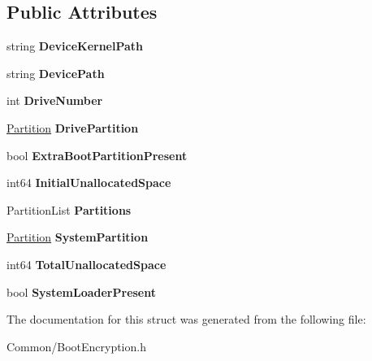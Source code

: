 \subsection*{Public Attributes}
\begin{DoxyCompactItemize}
\item 
\mbox{\label{struct_gost_crypt_1_1_system_drive_configuration_a2a97c9f7ce646028174f566e802a169f}} 
string {\bfseries Device\+Kernel\+Path}
\item 
\mbox{\label{struct_gost_crypt_1_1_system_drive_configuration_ac235ccb78431f067b64b8c2bf45d0c8a}} 
string {\bfseries Device\+Path}
\item 
\mbox{\label{struct_gost_crypt_1_1_system_drive_configuration_a5974148430f34abe503b290e932fd532}} 
int {\bfseries Drive\+Number}
\item 
\mbox{\label{struct_gost_crypt_1_1_system_drive_configuration_a0f1f80f1abd4b6da0421886583598222}} 
\hyperlink{struct_gost_crypt_1_1_partition}{Partition} {\bfseries Drive\+Partition}
\item 
\mbox{\label{struct_gost_crypt_1_1_system_drive_configuration_acd5386023b80de3a2c6fc0eeba8c6b7b}} 
bool {\bfseries Extra\+Boot\+Partition\+Present}
\item 
\mbox{\label{struct_gost_crypt_1_1_system_drive_configuration_aabed1e038b5ce4fac284435ada465390}} 
int64 {\bfseries Initial\+Unallocated\+Space}
\item 
\mbox{\label{struct_gost_crypt_1_1_system_drive_configuration_ad90bccddf219f4c6bf108b8f90e6b535}} 
Partition\+List {\bfseries Partitions}
\item 
\mbox{\label{struct_gost_crypt_1_1_system_drive_configuration_afdcf6c8c34aa2bbcdeaeb05f1699f29f}} 
\hyperlink{struct_gost_crypt_1_1_partition}{Partition} {\bfseries System\+Partition}
\item 
\mbox{\label{struct_gost_crypt_1_1_system_drive_configuration_ace246df050912169414e000880f46862}} 
int64 {\bfseries Total\+Unallocated\+Space}
\item 
\mbox{\label{struct_gost_crypt_1_1_system_drive_configuration_a0095521fe068ffe9eb5fce2036472a18}} 
bool {\bfseries System\+Loader\+Present}
\end{DoxyCompactItemize}


The documentation for this struct was generated from the following file\+:\begin{DoxyCompactItemize}
\item 
Common/Boot\+Encryption.\+h\end{DoxyCompactItemize}

